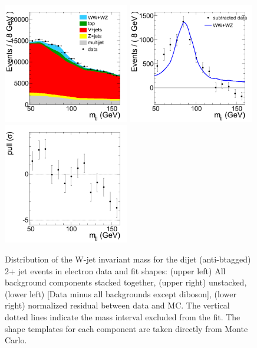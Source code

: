 \begin{figure}[h!]
  {\centering
    \includegraphics[width=0.49\textwidth]{figs/mjjfit/DibosonConvolvedMCTemplatelnujj_electron_Stacked.png}
    \includegraphics[width=0.49\textwidth]{figs/mjjfit/DibosonConvolvedMCTemplatelnujj_electron_Subtracted.png}
    \includegraphics[width=0.49\textwidth]{figs/mjjfit/DibosonConvolvedMCTemplatelnujj_electron_Pull.png}
    \caption{Distribution of the W-jet invariant mass for the dijet (anti-btagged) 2+ jet events in electron data and fit shapes: 
      (upper left) All background components stacked together, 
      (upper right) unstacked, (lower left) [Data minus all backgrounds except diboson],  
      (lower right) normalized residual between data and MC. The vertical dotted lines
      indicate the mass interval excluded from the fit. The shape templates for each component are taken directly from Monte Carlo.}
    \label{fig:mjjfit_ConvolvedMCTemplate_el}}
\end{figure}



